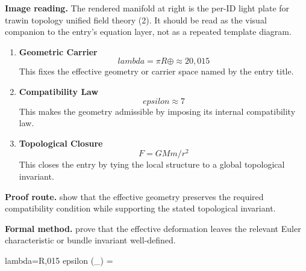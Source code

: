 \begin{samepage}
\noindent\begin{minipage}[t]{0.45\linewidth}
\vspace{0pt}
\raggedright
\scriptsize\textbf{Image reading.} The rendered manifold at right is the per-ID light plate for trawin topology unified field theory (2). It should be read as the visual companion to the entry's equation layer, not as a repeated template diagram.\par
\end{minipage}\hfill
\begin{minipage}[t]{0.53\linewidth}
\vspace*{-0.10in}
\raggedright
{}
\end{minipage}
\end{samepage}

\clearpage


\begin{enumerate}[leftmargin=1.6em,itemsep=9pt,topsep=6pt]
\item \textbf{Geometric Carrier}
\[
lambda=\pi R\oplus\approx20,015
\]
This fixes the effective geometry or carrier space named by the entry title.

\item \textbf{Compatibility Law}
\[
epsilon\approx7
\]
This makes the geometry admissible by imposing its internal compatibility law.

\item \textbf{Topological Closure}
\[
F=GMm/r^{2}
\]
This closes the entry by tying the local structure to a global topological invariant.
\end{enumerate}

\textbf{Proof route.} show that the effective geometry preserves the required compatibility condition while supporting the stated topological invariant.

\textbf{Formal method.} prove that the effective deformation leaves the relevant Euler characteristic or bundle invariant well-defined.

\medskip
{}

\begin{tzpsnapshot}
\end{tzpsnapshot}

\tzpequationlinks
  {lambda=\pi R\oplus{},015}
  {epsilon}
  {\chi(_{}) = \cdots}
